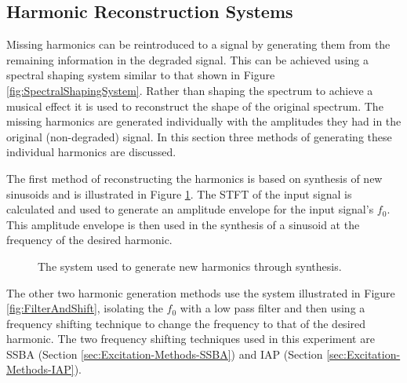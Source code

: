 	\subsection{Harmonic Reconstruction Systems}
	\label{sec:PerceptualExperiments-Reconstruction-Systems}
		Missing harmonics can be reintroduced to a signal by generating them from the remaining information in the
		degraded signal. This can be achieved using a spectral shaping system similar to that shown in Figure
		\ref{fig:SpectralShapingSystem}. Rather than shaping the spectrum to achieve a musical effect it is used to
		reconstruct the shape of the original spectrum. The missing harmonics are generated individually with the
		amplitudes they had in the original (non-degraded) signal. In this section three methods of generating
		these individual harmonics are discussed.

		The first method of reconstructing the harmonics is based on synthesis of new sinusoids and is illustrated
		in Figure \ref{fig:Synthesise}. The STFT of the input signal is calculated and used to generate an
		amplitude envelope for the input signal's $f_{0}$. This amplitude envelope is then used in the synthesis of
		a sinusoid at the frequency of the desired harmonic.

		\begin{figure}[h!]
			\centering
			\caption{The system used to generate new harmonics through synthesis.}
			\label{fig:Synthesise}
		\end{figure}

		The other two harmonic generation methods use the system illustrated in Figure \ref{fig:FilterAndShift},
		isolating the $f_{0}$ with a low pass filter and then using a frequency shifting technique to change the
		frequency to that of the desired harmonic. The two frequency shifting techniques used in this experiment
		are SSBA (Section \ref{sec:Excitation-Methods-SSBA}) and IAP (Section \ref{sec:Excitation-Methods-IAP}).

